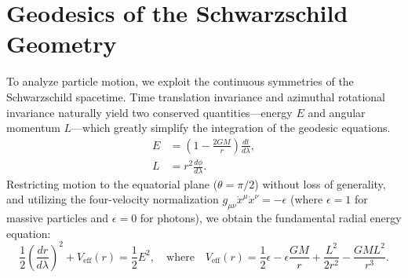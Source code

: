 \documentclass[11pt, a4paper]{report}
\begin{document}
\section{Geodesics of the Schwarzschild Geometry}
To analyze particle motion, we exploit the continuous symmetries of the Schwarzschild spacetime. Time translation invariance and azimuthal rotational invariance naturally yield two conserved quantities—energy $E$ and angular momentum $L$—which greatly simplify the integration of the geodesic equations.
\begin{align}
E &= \left(1-\frac{2GM}{r}\right)\frac{dt}{d\lambda}, \label{eq:energy_conserved} \\
L &= r^{2} \frac{d\phi}{d\lambda}. \label{eq:angular_conserved}
\end{align}
Restricting motion to the equatorial plane ($\theta = \pi/2$) without loss of generality, and utilizing the four-velocity normalization $g_{\mu\nu}\dot{x}^\mu \dot{x}^\nu = -\epsilon$ (where $\epsilon=1$ for massive particles and $\epsilon=0$ for photons), we obtain the fundamental radial energy equation:
\begin{equation}
\label{eq:radial_energy_eq}
\frac{1}{2}\left(\frac{dr}{d\lambda}\right)^{2} + V_{\text{eff}}(r) = \frac{1}{2}E^2, \quad \text{where} \quad V_{\text{eff}}(r) = \frac{1}{2}\epsilon - \epsilon\frac{GM}{r} + \frac{L^{2}}{2r^{2}} - \frac{GML^{2}}{r^{3}}.
\end{equation}
\end{document}
